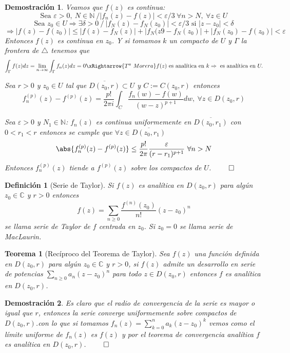 \documentclass[12pt]{book}
\newtheorem{defi}{Definición}[chapter]
\newtheorem{theorem}{Teorema}[chapter]
\newtheorem*{dem}{Demostración}
\newcommand{\C}{\mathbb{C}}
\newcommand{\N}{\mathbb{N}}
\begin{document}
\begin{dem}
Veamos que $f(z)$ es continua:
$$\text{Sea } \varepsilon >0,\ N \in \N\ / |f_n(z)-f(z)| < \varepsilon/3\ \forall n> N,\ \forall z\in U$$
$$\text{Sea } z_0 \in U \Rightarrow \exists \delta >0\ /\ |f_N(z)-f_N(z_0)|<\varepsilon/3 \text{ si }|z-z_0|<\delta$$
$$ \Rightarrow |f(z)-f(z_0)| \leq |f(z)-f_N(z)|+|f_N(z9-f_N(z_0)|+|f_N(z_0)-f(z_0)|<\varepsilon$$
Entonces $f(z)$ es continua en $z_0$. Y si tomamos $k$ un compacto de $U$ y $\Gamma$ la frontera de $\triangle$ tenemos que
$$\int_\Gamma f(z)dz = \lim_{n\to \infty}\int_\Gamma f_n(z)dz = 0 \xRightarrow{T^a\ Morera} f(z) \text{ es analítica en } k\Rightarrow \text{ es analítica en } U.$$

Sea $r>0$ y $z_0\in U$ tal que $\overline{D(z_0,r)}\subset U$ y $C := C(z_0,r)$ entonces
$$f_n^{(p)}(z) - f^{(p)}(z) = \frac{p!}{2\pi i}\int_C \frac{f_n(w)-f(w)}{(w-z)^{p+1}}dw,\ \forall z\in D(z_0,r)$$

Sea $\varepsilon >0$ y $N_1 \in \N$: $f_n(z)$ es continua uniformemente en $\overline{D(z_0,r_1)}$ con $0<r_1<r$ entonces  se cumple que $\forall z \in\overline{D(z_0,r_1)}$
$$\abs{f_n^{(p)}(z) - f^{(p)}(z)} \leq \frac{p!}{2\pi}\frac{\varepsilon}{(r-r_1)^{p+1}}\ \forall n>N$$
Entonces $f_n^{(p)}(z)$ tiende a $f^{(p)}(z)$ sobre los compactos de $U$. $\qed$
\end{dem}

\begin{defi}[Serie de Taylor]
Si $f(z)$ es analítica en $D(z_0,r)$ para algún $z_0\in\C$ y $r>0$ entonces
$$f(z) = \sum_{n\geq 0} \frac{f^{(n)}(z_0)}{n!}(z-z_0)^n$$
se llama serie de Taylor de $f$ centrada en $z_0$. Si $z_0=0$ se llama serie de MacLaurin. 
\end{defi}


\begin{theorem}[Recíproco del Teorema de Taylor]
Sea $f(z)$ una función definida en $D(z_0,r)$ para algún $z_0\in \C$ y $r>0$, si $f(z)$ admite un desarrollo en serie de potencias $\sum_{n\geq 0} a_n(z-z_0)^n$ para todo $z\in D(z_0,r)$ entonces $f$ es analítica en $D(z_0,r)$.
\end{theorem}

\begin{dem}
Es claro que el radio de convergencia de la serie es mayor o igual que $r$, entonces la serie converge uniformemente sobre compactos de $D(z_0,r)$.con lo que si tomamos $f_n(z) = \sum_{k= 0}^n a_k(z-z_0)^k$ vemos como el límite uniforme de $f_n(z)$ es $f(z)$ y por el teorema de convergencia analítica $f$ es analítica en $D(z_0,r)$. $\qed$
\end{dem}
\end{document}

